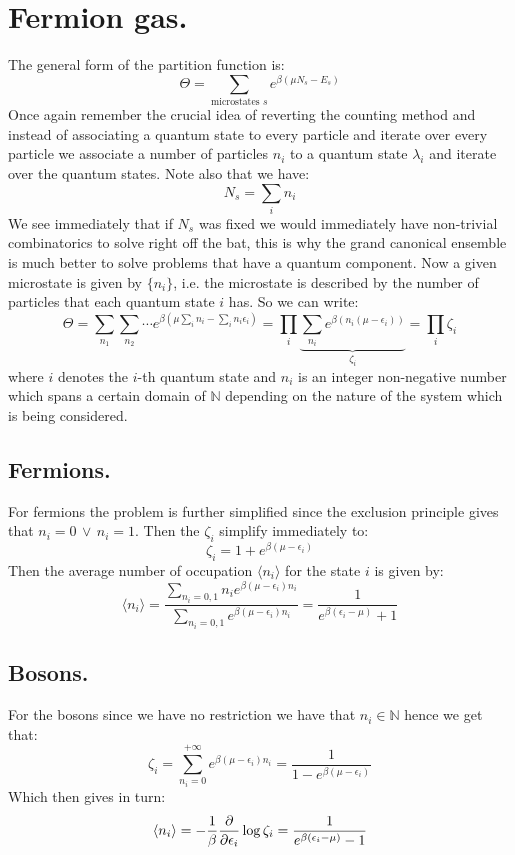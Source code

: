 \documentclass[10pt,a4paper]{book}
\begin{document}
\section{Fermion gas.}
The general form of the partition function is:
\[
\Theta = \sum_{\text{microstates } s} e^{\beta(\mu N_s - E_s)}
\]
Once again remember the crucial idea of reverting the counting method and instead of associating a quantum state to every particle and iterate over every particle we associate a number of particles $n_i$ to a quantum state $\lambda_i$ and iterate over the quantum states. Note also that we have:
\[
N_s = \sum_{i} n_i
\]
We see immediately that if $N_s$ was fixed we would immediately have non-trivial combinatorics to solve right off the bat, this is why the grand canonical ensemble is much better to solve problems that have a quantum component. Now a given microstate is given by $\{n_i\}$, i.e. the microstate is described by the number of particles that each quantum state $i$ has. So we can write:
\[
\Theta = \sum_{n_1} \sum_{n_2} \cdots e^{\beta (\mu \sum_i n_i - \sum_i n_i \epsilon_i)} = \prod_i \underbrace{\sum_{n_i} e^{\beta (n_i (\mu - \epsilon_i))}}_{\zeta_i}=\prod_i\zeta_i
\]
where $i$ denotes the $i$-th quantum state and $n_i$ is an integer non-negative number which spans a certain domain of $\mathbb{N}$ depending on the nature of the system which is being considered.

\subsection{Fermions.}
For fermions the problem is further simplified since the exclusion principle  gives that $n_i = 0\, \lor\, n_i = 1$. Then the $\zeta_i$ simplify immediately to:
\[
\zeta_i = 1 + e^{\beta(\mu - \epsilon_i)}
\]
Then the average number of occupation $\langle n_i\rangle$ for the state $i$  is given by:
\[
\langle n_i \rangle = \frac{\sum_{n_i = 0, 1} n_i e^{\beta(\mu - \epsilon_i)n_i}}{\sum_{n_i = 0, 1} e^{\beta(\mu - \epsilon_i)n_i}} = \frac{1}{e^{\beta(\epsilon_i - \mu)} + 1}
\]
\subsection{Bosons.}
For the bosons since we have no restriction we have that $n_i \in \mathbb{N}$ hence we get that:
\[
\zeta_i = \sum_{n_i = 0}^{+\infty} e^{\beta(\mu - \epsilon_i)n_i} = \frac{1}{1 - e^{\beta(\mu - \epsilon_i)}}
\]
Which then gives in turn:
\[
\langle n_i \rangle  = - \frac{1}{\beta} \pdv{}{\epsilon_i} \log \zeta_i = \frac{1}{e^{\beta(\epsilon_i - \mu)} - 1}
\]
\end{document}
